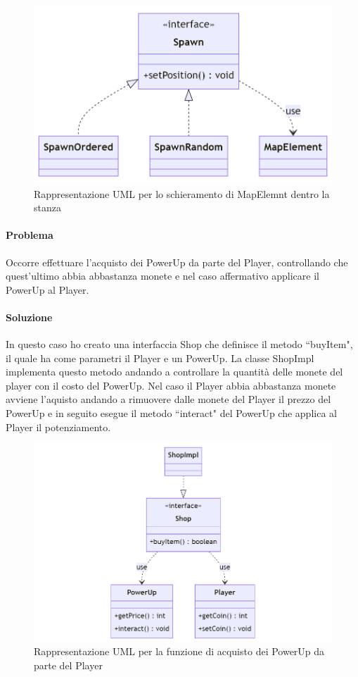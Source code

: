 \documentclass[a4paper,12pt]{report}
\begin{document}
\begin{figure}[H]
    \centering{}
    \includegraphics[scale=0.4]{diagram/Spawn.png}
    \caption{Rappresentazione UML per lo schieramento di MapElemnt dentro la stanza}
    \label{img:Spawn}
\end{figure}

\paragraph{Problema} Occorre effettuare l'acquisto dei PowerUp da parte del Player, controllando che quest'ultimo abbia abbastanza monete e nel caso affermativo applicare il PowerUp al Player.
\paragraph{Soluzione} In questo caso ho creato una interfaccia Shop che definisce il metodo ``buyItem", il quale ha come parametri il Player e un PowerUp. La classe ShopImpl implementa questo metodo andando a controllare la quantità delle monete del player con il costo del PowerUp. Nel caso il Player abbia abbastanza monete avviene l'aquisto andando a rimuovere dalle monete del Player il prezzo del PowerUp e in seguito esegue il metodo ``interact" del PowerUp che applica al Player il potenziamento.
\begin{figure}[H]
    \centering{}
    \includegraphics[scale=0.4]{diagram/Shop.png}
    \caption{Rappresentazione UML per la funzione di acquisto dei PowerUp da parte del Player}
    \label{img:Shop}
\end{figure}
\end{document}
